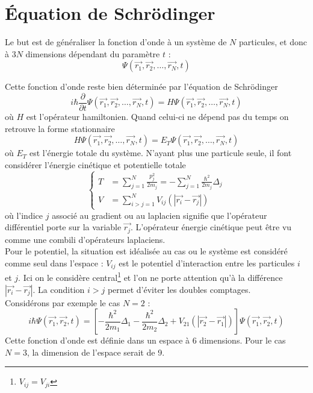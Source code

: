 \documentclass	[11pt, a4paper, openany]{book}
\begin{document}
	\section{Équation de Schrödinger}
	Le but est de généraliser la fonction d'onde à un système de $N$ particules, et donc à $3N$ dimensions dépendant du paramètre $t$ :
	\begin{equation}
		\Psi(\vec{r_1}, \vec{r_2}, \dots, \vec{r_N}, t)
	\end{equation}
	
	Cette fonction d'onde reste bien déterminée par l'équation de Schrödinger 
	\begin{equation}
		i\hbar\frac{\partial}{\partial t} \Psi(\vec{r_1}, \vec{r_2}, \dots, \vec{r_N}, t) = H \Psi(\vec{r_1}, \vec{r_2}, \dots, \vec{r_N}, t)
	\end{equation}
	où $H$ est l'opérateur hamiltonien. Quand celui-ci ne dépend pas du temps on retrouve la forme stationnaire
	\begin{equation}
		H\Psi(\vec{r_1}, \vec{r_2}, \dots, \vec{r_N}, t) = E_T\Psi(\vec{r_1}, \vec{r_2}, \dots, \vec{r_N}, t)
	\end{equation}
	où $E_T$ est l'énergie totale du système. N'ayant plus une particule seule, il font considérer l'énergie cinétique et potentielle totale
	\begin{equation}
		\left\{\begin{array}{ll}
		T &= \sum_{j=1}^N \frac{p_j^2}{2m_j} = - \sum_{j=1}^N \frac{\hbar^2}{2m_j}\Delta_j\\
		V &= \sum_{i>j=1}^N V_{ij}(|\vec{r_i}-\vec{r_j}|)
		\end{array}\right.
	\end{equation}
	où l'indice $j$ associé au gradient ou au laplacien signifie que l'opérateur différentiel porte sur la variable $\vec{r_j}$. L'opérateur énergie cinétique peut être vu comme une combili d'opérateurs laplaciens.\\
	Pour le potentiel, la situation est idéalisée au cas ou le système est considéré comme seul dans l'espace : $V_{ij}$ est le potentiel d'interaction entre les particules $i$ et $j$. Ici on le considère central\footnote{$V_{ij} = V_{ji}$} et l'on ne porte attention qu'à la différence $|\vec{r_i}-\vec{r_j}|$. La condition $i>j$ permet d'éviter les doubles comptages.\\
	
	Considérons par exemple le cas $N=2$ :
	\begin{equation}
		i\hbar\Psi(\vec{r_1}, \vec{r_2},t) = \left[-\frac{\hbar^2}{2m_1}\Delta_1 - \frac{\hbar^2}{2m_2}\Delta_2 + V_{21}(|\vec{r_2}-\vec{r_1}|) \right]\Psi(\vec{r_1}, \vec{r_2},t)
	\end{equation}
	Cette fonction d'onde est définie dans un espace à 6 dimensions. Pour le cas $N=3$, la dimension de l'espace serait de 9.
	
\end{document}
